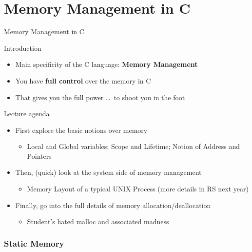 \part{Memory Management in C}\toc
\begin{frame}{Memory Management in C}
  \begin{block}{Introduction}
    \begin{itemize}
    \item Main specificity of the C language: \alert{\textbf{Memory Management}}
    \item You have \textbf{full control} over the memory in C
    \item That gives you the full power \ldots\ to shoot you in the foot
    \end{itemize}
  \end{block}

  \begin{block}{Lecture agenda}
    \begin{itemize}
    \item First explore the basic notions over memory
      \begin{itemize}
      \item Local and Global variables; Scope and Lifetime; Notion of Address
        and Pointers
      \end{itemize}

    \item Then, (quick) look at the system side of memory management
      \begin{itemize}
      \item Memory Layout of a typical UNIX Process (more details in RS next year)
      \end{itemize}

    \item Finally, go into the full details of memory allocation/deallocation
      \begin{itemize}
      \item Student's hated malloc and associated madness
      \end{itemize}
    \end{itemize}
  \end{block}
\end{frame}
\section{Static Memory}
